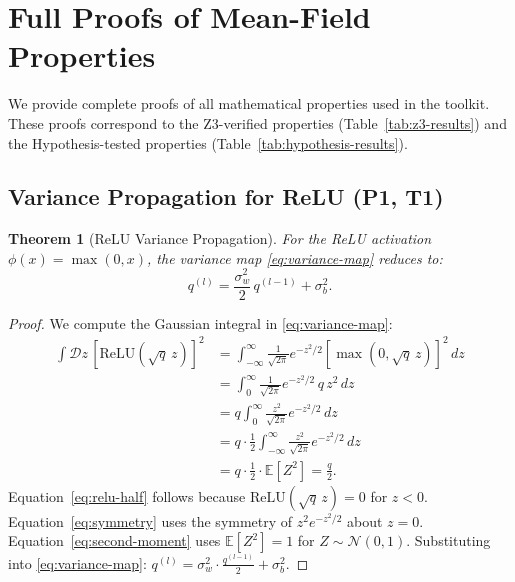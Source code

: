 \documentclass[10pt]{article}
\newcommand{\EE}{\mathbb{E}}
\newtheorem{theorem}{Theorem}
\begin{document}
\clearpage
\appendix

\section{Full Proofs of Mean-Field Properties}
\label{app:proofs}

We provide complete proofs of all mathematical properties used in the toolkit.
These proofs correspond to the Z3-verified properties (Table~\ref{tab:z3-results}) and the Hypothesis-tested properties (Table~\ref{tab:hypothesis-results}).

\subsection{Variance Propagation for ReLU (P1, T1)}

\begin{theorem}[ReLU Variance Propagation]
\label{thm:relu-variance}
For the ReLU activation $\phi(x) = \max(0, x)$, the variance map \eqref{eq:variance-map} reduces to:
\[
q^{(l)} = \frac{\sigma_w^2}{2}\, q^{(l-1)} + \sigma_b^2.
\]
\end{theorem}

\begin{proof}
We compute the Gaussian integral in \eqref{eq:variance-map}:
\begin{align}
\int \mathcal{D}z\, [\text{ReLU}(\sqrt{q}\, z)]^2
&= \int_{-\infty}^{\infty} \frac{1}{\sqrt{2\pi}} e^{-z^2/2} [\max(0, \sqrt{q}\, z)]^2\, dz \\
&= \int_0^{\infty} \frac{1}{\sqrt{2\pi}} e^{-z^2/2}\, q\, z^2\, dz \label{eq:relu-half}\\
&= q \int_0^{\infty} \frac{z^2}{\sqrt{2\pi}} e^{-z^2/2}\, dz \\
&= q \cdot \frac{1}{2} \int_{-\infty}^{\infty} \frac{z^2}{\sqrt{2\pi}} e^{-z^2/2}\, dz \label{eq:symmetry}\\
&= q \cdot \frac{1}{2} \cdot \EE[Z^2] = \frac{q}{2}. \label{eq:second-moment}
\end{align}
Equation~\eqref{eq:relu-half} follows because $\text{ReLU}(\sqrt{q}\,z) = 0$ for $z < 0$.
Equation~\eqref{eq:symmetry} uses the symmetry of $z^2 e^{-z^2/2}$ about $z=0$.
Equation~\eqref{eq:second-moment} uses $\EE[Z^2] = 1$ for $Z \sim \mathcal{N}(0,1)$.
Substituting into \eqref{eq:variance-map}: $q^{(l)} = \sigma_w^2 \cdot \frac{q^{(l-1)}}{2} + \sigma_b^2$.
\end{proof}
\end{document}
